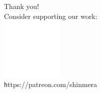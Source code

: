 \documentclass[14pt,t,aspectratio=169]{beamer}
\begin{document}
{
  \begin{frame}[c]{ }
    \centering\color{white}
    \vspace{2cm}
    {\LARGE Thank you!} \\
    \vspace{0.2cm}
    Consider supporting our work: \\
    \includegraphics[width=3cm]{patreon} \\
    {\texttt https://patreon.com/shinmera}
  \end{frame}}
\end{document}
